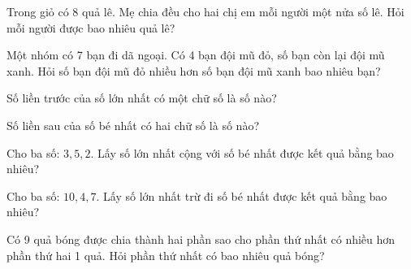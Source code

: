 \begin{ex}
Trong giỏ có 8 quả lê. Mẹ chia đều cho hai chị em mỗi người một nửa số lê. Hỏi mỗi người được bao nhiêu quả lê?
\end{ex}

\begin{ex}
Một nhóm có 7 bạn đi dã ngoại. Có 4 bạn đội mũ đỏ, số bạn còn lại đội mũ xanh. Hỏi số bạn đội mũ đỏ nhiều hơn số bạn đội mũ xanh bao nhiêu bạn?
\end{ex}

\begin{ex}
Số liền trước của số lớn nhất có một chữ số là số nào?
\end{ex}

\begin{ex}
Số liền sau của số bé nhất có hai chữ số là số nào?
\end{ex}

\begin{ex}
Cho ba số: $3, 5, 2$. Lấy số lớn nhất cộng với số bé nhất được kết quả bằng bao nhiêu?
\end{ex}

\begin{ex}
Cho ba số: $10, 4, 7$. Lấy số lớn nhất trừ đi số bé nhất được kết quả bằng bao nhiêu?
\end{ex}

\begin{ex}
Có 9 quả bóng được chia thành hai phần sao cho phần thứ nhất có nhiều hơn phần thứ hai 1 quả. Hỏi phần thứ nhất có bao nhiêu quả bóng?
\end{ex}

